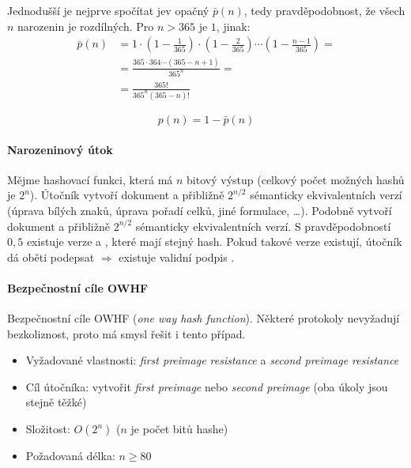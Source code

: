 Jednodušší je nejprve spočítat jev opačný $\bar p(n)$, tedy pravděpodobnost, že všech $n$ narozenin je rozdílných. Pro $n > 365$ je $1$, jinak:
\begin{equation}
\begin{aligned}
\bar p(n) &= 1 \cdot \left(1-\frac{1}{365}\right) \cdot \left(1-\frac{2}{365}\right) \cdots \left(1-\frac{n-1}{365}\right) = \\
&=  \frac{365 \cdot 364 \cdots (365-n+1)}{365^n} = \\
&=  \frac{365!}{365^n (365-n)!}
\end{aligned}
\end{equation}

\begin{equation}
    p(n) = 1 - \bar p(n)
\end{equation}

\paragraph*{Narozeninový útok} Mějme hashovací funkci, která má $n$ bitový výstup (celkový počet možných hashů je $2^{n}$). Útočník vytvoří dokument  a přibližně $2^{n/2}$ sémanticky ekvivalentních verzí (úprava bílých znaků, úprava pořadí celků, jiné formulace, \dots). Podobně vytvoří dokument  a přibližně $2^{n/2}$ sémanticky ekvivalentních verzí. S pravděpodobností $0,5$ existuje verze  a , které mají stejný hash. Pokud takové verze existují, útočník dá oběti podepsat  $\Rightarrow$ existuje validní podpis .

\paragraph*{Bezpečnostní cíle OWHF} Bezpečnostní cíle OWHF (\textit{one way hash function}). Některé protokoly nevyžadují bezkoliznost, proto má smysl řešit i tento případ. \begin{itemize}
    \item Vyžadované vlastnosti: \textit{first preimage resistance} a \textit{second preimage resistance}
    \item Cíl útočníka: vytvořit \textit{first preimage} nebo \textit{second preimage} (oba úkoly jsou stejně těžké)
    \item Složitost: $O(2^n)$ ($n$ je počet bitů hashe)
    \item Požadovaná délka: $n \geq 80$
\end{itemize}

